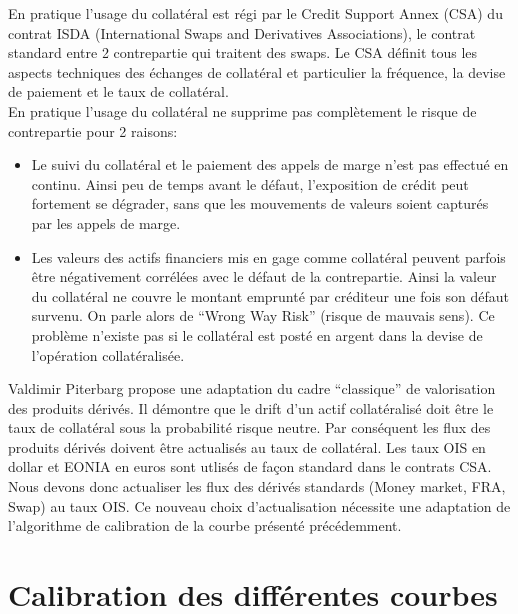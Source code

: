 \documentclass{article}
\begin{document}
En pratique l’usage du collatéral est régi par le Credit Support Annex (CSA) du contrat ISDA (International Swaps and Derivatives Associations), le contrat standard entre 2 contrepartie qui traitent des swaps. Le CSA définit tous les aspects techniques des échanges de collatéral et particulier la fréquence, la devise de paiement et  le taux de collatéral.\\

En pratique l’usage du collatéral ne supprime pas complètement le risque de contrepartie pour 2 raisons:
\begin{itemize}

\item Le suivi du collatéral et le paiement des appels de marge n’est pas effectué en continu. Ainsi peu de temps avant le défaut, l’exposition de crédit peut fortement se dégrader, sans que les mouvements de valeurs soient capturés par les appels de marge.\\

\item Les valeurs des actifs financiers mis en gage comme collatéral peuvent parfois être négativement corrélées avec le défaut de la contrepartie. Ainsi la valeur du collatéral ne couvre le montant emprunté par créditeur une fois son défaut survenu. On parle alors de “Wrong Way Risk” (risque de mauvais sens). Ce problème n’existe pas si le collatéral est posté en argent dans la devise de l’opération collatéralisée.\\

\end{itemize}

Valdimir Piterbarg propose une adaptation du cadre “classique” de valorisation des produits dérivés. Il démontre que le drift d’un actif collatéralisé doit être le taux de collatéral sous la probabilité risque neutre. Par conséquent les flux des produits dérivés doivent être actualisés au taux de collatéral. Les taux OIS en dollar et EONIA en euros sont utlisés de façon standard dans le contrats CSA. Nous devons donc actualiser les flux des dérivés standards (Money market, FRA, Swap) au taux OIS. Ce nouveau choix d'actualisation nécessite une adaptation de l'algorithme de calibration de la courbe présenté précédemment.\\

\section*{Calibration des différentes courbes}
\end{document}
